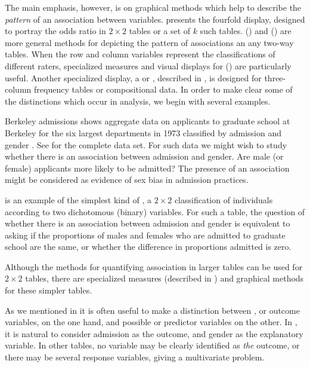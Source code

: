 \documentclass[11pt]{book}\usepackage[]{graphicx}\usepackage[]{color}
\begin{document}
The main emphasis, however, is on graphical methods which help
to describe the \emph{pattern} of an association between variables.
 presents the fourfold display,
designed to portray the odds ratio in $2 \times 2$ tables or a set
of $k$ such tables.
() and 
() are more general methods for depicting
the pattern of associations an any two-way tables.
When the row and column variables represent the classifications
of different raters, specialized measures and visual displays
for  () are particularly
useful.
Another specialized display, a  or ,
described in ,
is designed
for three-column frequency tables or compositional data.
In order to make clear some of the distinctions which occur in
\ctab analysis, we begin with several examples.

\begin{Example}[berkeley1]{Berkeley admissions}
 shows aggregate data on applicants to
graduate school at Berkeley for the six largest departments in 1973
classified by admission and gender
\citep{Bickel-etal:75}.
See  for the complete data set.
For such data we might wish to study whether there is an association
between admission and gender.
Are male (or female) applicants more likely to be admitted?
The presence of an association might be considered as
evidence of sex bias in admission practices.

 is an example of the simplest kind of \ctab,
a $2 \times 2$ classification of individuals according to two
dichotomous (binary) variables.
For such a table, the question of whether there is an association
between admission and gender is equivalent to asking if the
proportions of males and females who are admitted to graduate
school are the same, or whether the difference in proportions
admitted is zero.

\end{Example}

Although the methods for quantifying association in larger tables can be
used for $2 \times 2$ tables, there are specialized measures
(described in ) and
graphical methods for these simpler tables.

As we mentioned in 
it is often useful to make a distinction between ,
or outcome variables, on the one hand, 
and possible 
or predictor variables on the other.
In , it is natural to consider admission
as the outcome, and gender as the explanatory variable.
In other tables, no variable may be clearly identified as \emph{the}
outcome, or there may be several response variables, giving a
multivariate problem.
\end{document}
